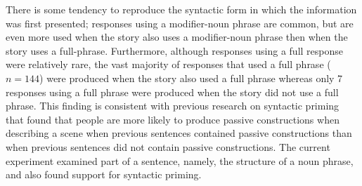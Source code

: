 \documentclass[output=paper]{langsci/langscibook}
\begin{document}
There is some tendency to reproduce the syntactic form in which the
information was first presented; responses using a modifier-noun
phrase are common, but are even more used when the story also uses a
modifier-noun phrase then when the story uses a full-phrase.
Furthermore, although responses using a full response were relatively
rare, the vast majority of responses that used a full phrase ($n=144$)
were produced when the story also used a full phrase whereas only 7
responses using a full phrase were produced when the story did not use
a full phrase. This finding is consistent with previous research on
syntactic priming \citep{bock1986syntactic,bock1990framing} that found that
people are more likely to produce passive constructions when
describing a scene when previous sentences contained passive
constructions than when previous sentences did not contain passive
constructions. The current experiment examined part of a sentence,
namely, the structure of a noun phrase, and also found support for
syntactic priming.
\end{document}
